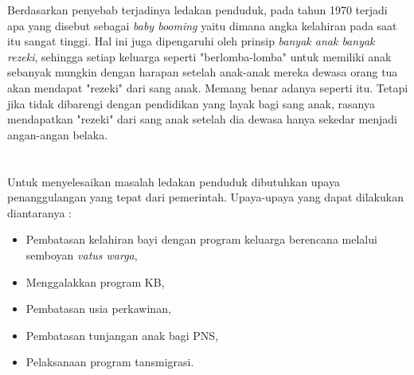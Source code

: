 \documentclass[11pt,a4paper]{report}
\begin{document}
	Berdasarkan penyebab terjadinya ledakan penduduk, pada tahun 1970 terjadi apa yang disebut sebagai \textit{baby booming} yaitu dimana angka kelahiran pada saat itu sangat tinggi. Hal ini juga dipengaruhi oleh prinsip \textit{banyak anak banyak rezeki}, sehingga setiap keluarga seperti "berlomba-lomba" untuk memiliki anak sebanyak mungkin dengan harapan setelah anak-anak mereka dewasa orang tua akan mendapat "rezeki" dari sang anak. Memang benar adanya seperti itu. Tetapi jika tidak dibarengi dengan pendidikan yang layak bagi sang anak, rasanya mendapatkan "rezeki" dari sang anak setelah dia dewasa hanya sekedar menjadi angan-angan belaka.\\\\\
	\\
	Untuk menyelesaikan masalah ledakan penduduk dibutuhkan upaya penanggulangan yang tepat dari pemerintah. Upaya-upaya yang dapat dilakukan diantaranya : 
	\begin{itemize}
		\item Pembatasan kelahiran bayi dengan program keluarga berencana melalui semboyan \textit{vatus warga},
		\item Menggalakkan program KB,
		\item Pembatasan usia perkawinan,
		\item Pembatasan tunjangan anak bagi PNS,
		\item Pelaksanaan program tansmigrasi.
	\end{itemize}
\end{document}
